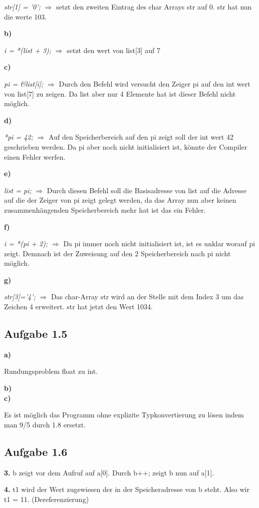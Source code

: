 \documentclass[a4paper,graphics,11pt]{article}
\newcommand{\aufgabe}[1]{\subsection*{Aufgabe #1}}
\begin{document}
\textit{str[1] = ’0’;} $\Longrightarrow$ setzt den zweiten Eintrag des char Arrays str auf 0. str hat nun die werte 103.

\textbf{b)}

\textit{i = *(list + 3);} $\Longrightarrow$ setzt den wert von list[3] auf 7

\textbf{c)}

\textit{pi =  \&list[i];} $\Longrightarrow$ Durch den Befehl wird versucht den Zeiger pi auf den int wert von list[7] zu zeigen. Da list aber nur 4 Elemente hat ist dieser Befehl nicht möglich.

\textbf{d)}

\textit{*pi = 42;} $\Longrightarrow$ Auf den Speicherbereich auf den pi zeigt soll der int wert 42 geschrieben werden. Da pi aber noch nicht initialisiert ist, könnte der Compiler einen Fehler werfen.

\textbf{e)}

\textit{list = pi;} $\Longrightarrow$ Durch diesen Befehl soll die Basisadresse von list auf die Adresse auf die der Zeiger von pi zeigt gelegt werden, da das Array nun aber keinen zusammenhängenden Speicherbereich mehr hat ist das ein Fehler.

\textbf{f)}

\textit{i = *(pi + 2);} $\Longrightarrow$ Da pi immer noch nicht initialisiert ist, ist es unklar worauf pi zeigt. Demnach ist der Zuweisung auf den 2 Speicherbereich nach pi nicht möglich.

\textbf{g)}

\textit{str[3]=’4’;} $\Longrightarrow$ Das char-Array str wird an der Stelle mit dem Index 3 um das Zeichen 4 erweitert. str hat jetzt den Wert 1034.

\newpage

\aufgabe{1.5}

\textbf{a)}

Rundungsproblem float zu int.

\textbf{b)}\\



\textbf{c)}

Es ist möglich das Programm ohne explizite Typkonvertierung zu lösen indem man 9/5 durch 1.8 ersetzt.

\aufgabe{1.6}

\textbf{3.} b zeigt vor dem Aufruf auf a[0]. Durch b++; zeigt b nun auf a[1].

\textbf{4.} t1 wird der Wert zugewiesen der in der Speicheradresse von b steht. Also wir t1 = 11. (Dereferenzierung)
\end{document}
